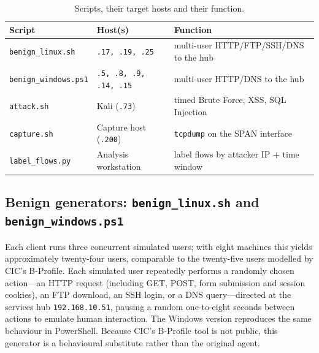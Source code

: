 \documentclass[11pt]{article}
\begin{document}
\begin{table}[h]
\centering
\caption{Scripts, their target hosts and their function.}
\label{tab:scripts}
\begin{tabular}{@{}lll@{}}
\toprule
Script & Host(s) & Function \\
\midrule
\texttt{benign\_linux.sh}    & \texttt{.17, .19, .25}          & multi-user HTTP/FTP/SSH/DNS to the hub \\
\texttt{benign\_windows.ps1} & \texttt{.5, .8, .9, .14, .15}   & multi-user HTTP/DNS to the hub \\
\texttt{attack.sh}           & Kali (\texttt{.73})            & timed Brute Force, XSS, SQL Injection \\
\texttt{capture.sh}          & Capture host (\texttt{.200})   & \texttt{tcpdump} on the SPAN interface \\
\texttt{label\_flows.py}     & Analysis workstation           & label flows by attacker IP + time window \\
\bottomrule
\end{tabular}
\end{table}

\subsection{Benign generators: \texttt{benign\_linux.sh} and \texttt{benign\_windows.ps1}}
Each client runs three concurrent simulated users; with eight machines this
yields approximately twenty-four users, comparable to the twenty-five users
modelled by CIC's B-Profile. Each simulated user repeatedly performs a randomly
chosen action---an HTTP request (including GET, POST, form submission and
session cookies), an FTP download, an SSH login, or a DNS query---directed at the
services hub \texttt{192.168.10.51}, pausing a random one-to-eight seconds
between actions to emulate human interaction. The Windows version reproduces the
same behaviour in PowerShell. Because CIC's B-Profile tool is not public, this
generator is a behavioural substitute rather than the original agent.
\end{document}
